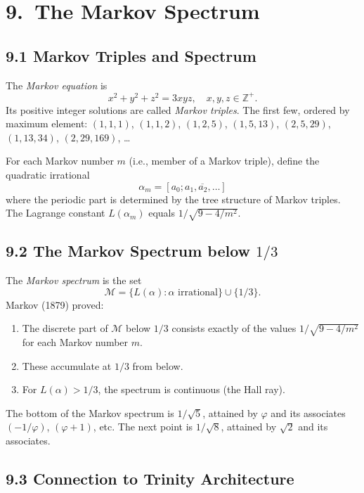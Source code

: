 \section{9.\ The Markov Spectrum}
\label{sec:gc-markov}

\subsection{9.1 Markov Triples and Spectrum}
\label{subsec:gc-markov-triples}

The \emph{Markov equation} is
\[
  x^2 + y^2 + z^2 = 3xyz,
  \quad x, y, z \in \mathbb{Z}^+.
\]
Its positive integer solutions are called
\emph{Markov triples}.
The first few, ordered by maximum element:
$(1,1,1)$, $(1,1,2)$, $(1,2,5)$, $(1,5,13)$,
$(2,5,29)$, $(1,13,34)$, $(2,29,169)$, \ldots

For each Markov number $m$ (i.e., member of a Markov
triple), define the quadratic irrational
\[
  \alpha_m = [a_0; \overline{a_1, a_2, \ldots}]
\]
where the periodic part is determined by the tree
structure of Markov triples.
The Lagrange constant $L(\alpha_m)$ equals
$1/\sqrt{9 - 4/m^2}$.

\subsection{9.2 The Markov Spectrum below $1/3$}
\label{subsec:gc-markov-spectrum}

The \emph{Markov spectrum} is the set
\[
  \mathcal{M} = \{L(\alpha) : \alpha \text{ irrational}\}
  \cup \{1/3\}.
\]
Markov (1879) proved:
\begin{enumerate}
  \item The discrete part of $\mathcal{M}$ below $1/3$
        consists exactly of the values
        $1/\sqrt{9-4/m^2}$ for each Markov number $m$.
  \item These accumulate at $1/3$ from below.
  \item For $L(\alpha) > 1/3$, the spectrum is
        continuous (the Hall ray).
\end{enumerate}
The bottom of the Markov spectrum is $1/\sqrt{5}$,
attained by $\varphi$ and its associates
$(-1/\varphi)$, $(\varphi+1)$, etc.
The next point is $1/\sqrt{8}$, attained by $\sqrt{2}$
and its associates.

\subsection{9.3 Connection to Trinity Architecture}
\label{subsec:gc-markov-trinity}

